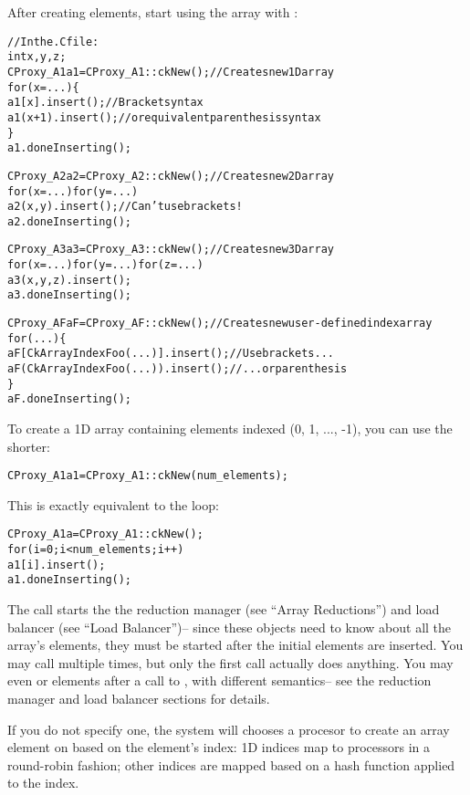 After creating elements, start using the array with 
:

\begin{alltt}
//In the .C file:
int x,y,z;
CProxy_A1 a1=CProxy_A1::ckNew();  //Creates new 1D array
for (x=...) \{
   a1[x  ].insert();  //Bracket syntax
   a1(x+1).insert();  // or equivalent parenthesis syntax
\}
a1.doneInserting();

CProxy_A2 a2=CProxy_A2::ckNew();   //Creates new 2D array
for (x=...) for (y=...)
   a2(x,y).insert();  //Can't use brackets!
a2.doneInserting();

CProxy_A3 a3=CProxy_A3::ckNew();   //Creates new 3D array
for (x=...) for (y=...) for (z=...)
   a3(x,y,z).insert();
a3.doneInserting();

CProxy_AF aF=CProxy_AF::ckNew();   //Creates new user-defined index array
for (...) \{
   aF[CkArrayIndexFoo(...)].insert(); //Use brackets...
   aF(CkArrayIndexFoo(...)).insert(); //  ...or parenthesis
\}
aF.doneInserting();

\end{alltt}

To create a 1D array containing elements indexed 
(0, 1, ..., -1), you can use the shorter:

\begin{alltt}
CProxy_A1 a1 = CProxy_A1::ckNew(num_elements);
\end{alltt}

This is exactly equivalent to the loop:
\begin{alltt}
CProxy_A1 a = CProxy_A1::ckNew();
for (i=0;i<num_elements;i++)
	a1[i].insert();
a1.doneInserting();
\end{alltt}


The  call starts the the reduction manager (see ``Array
Reductions'') and load balancer (see ``Load Balancer'')-- since
these objects need to know about all the array's elements, they
must be started after the initial elements are inserted.
You may call  multiple times, but only the first
call actually does anything.  You may even  or 
elements after a call to , with different semantics-- 
see the reduction manager and load balancer sections for details.

If you do not specify one, the system will chooses a procesor to 
create an array element on based on the element's index: 1D indices 
map to processors in a round-robin fashion; other indices are mapped 
based on a hash function applied to the index.

